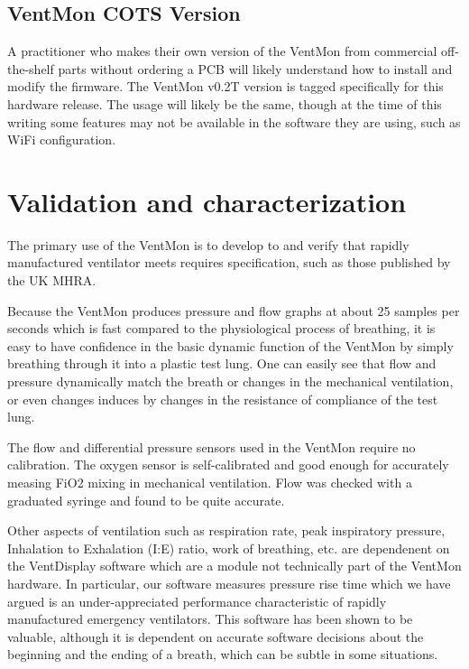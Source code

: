 \documentclass[11pt, letterpaper]{article}
\begin{document}
\subsection{VentMon COTS Version}

A practitioner who makes their own version of the VentMon from commercial off-the-shelf parts without ordering a PCB will likely understand how to install
and modify the firmware. The VentMon v0.2T\cite{VentMon02} version is tagged specifically for this hardware release. The usage will likely be the same, though at the time of this writing some features
may not be available in the software they are using, such as WiFi configuration.

\section{Validation and characterization}



The primary use of the VentMon is to develop to and verify that rapidly manufactured ventilator meets requires specification, such as those published by the
UK MHRA\cite{mhra2020specification}.

Because the VentMon produces pressure and flow graphs at about 25 samples per seconds which is fast compared to
the physiological process of breathing, it is easy to have confidence in the basic dynamic function of the VentMon
by simply breathing through it into a plastic test lung. One can easily see that flow and pressure dynamically
match the breath or changes in the mechanical ventilation, or even changes induces by changes in the resistance of
compliance of the test lung.

The flow and differential pressure sensors used in the VentMon require no calibration. The oxygen sensor is self-calibrated and
good enough for accurately measing FiO2 mixing in mechanical ventilation. Flow was checked with a graduated syringe and
found to be quite accurate.

Other aspects of ventilation such as respiration rate, peak inspiratory pressure, Inhalation to Exhalation (I:E) ratio,
work of breathing, etc. are dependenent on the VentDisplay software which are a module not technically part of the VentMon
hardware. In particular, our software measures pressure rise time which we have argued is an
under-appreciated performance characteristic of rapidly manufactured emergency ventilators\cite{schulz2020importance}.
This software has been shown to be valuable, although it is dependent on accurate software decisions about
the beginning and the ending of a breath, which can be subtle in some situations.
\end{document}
